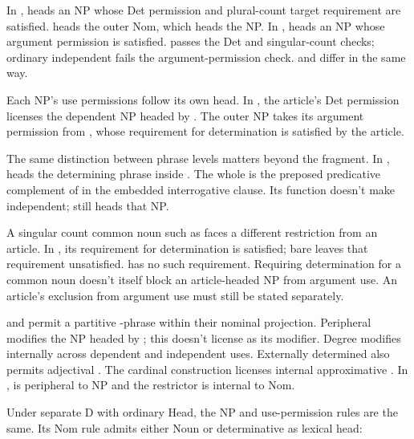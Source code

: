 \documentclass[12pt]{article}
\begin{document}
In ,  heads an NP whose Det permission and plural-count target requirement are satisfied.  heads the outer Nom, which heads the NP. In ,  heads an NP whose argument permission is satisfied.  passes the Det and singular-count checks; ordinary independent  fails the argument-permission check.  and  differ in the same way.

Each NP's use permissions follow its own head. In , the article's Det permission licenses the dependent NP headed by . The outer NP takes its argument permission from , whose requirement for determination is satisfied by the article.

The same distinction between phrase levels matters beyond the fragment. In ,  heads the determining phrase inside . The whole  is the preposed predicative complement of  in the embedded interrogative clause. Its function doesn't make  independent;  still heads that NP.

A singular count common noun such as  faces a different restriction from an article. In , its requirement for determination is satisfied; bare  leaves that requirement unsatisfied.  has no such requirement. Requiring determination for a common noun doesn't itself block an article-headed NP from argument use. An article's exclusion from argument use must still be stated separately.

 and  permit a partitive -phrase within their nominal projection. Peripheral  modifies the NP headed by ; this doesn't license  as its modifier. Degree  modifies  internally across dependent and independent uses. Externally determined  also permits adjectival . The cardinal construction  licenses internal approximative . In ,  is peripheral to NP and the restrictor  is internal to Nom.

Under separate D with ordinary Head, the NP and use-permission rules are the same. Its Nom rule admits either Noun or determinative as lexical head:
\end{document}
